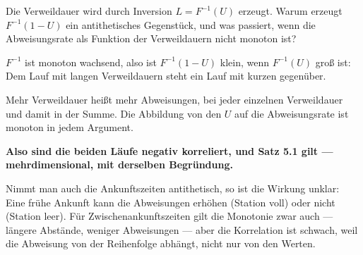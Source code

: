 \begin{aufgabe}
Die Verweildauer wird durch Inversion $L = F^{-1}(U)$ erzeugt. Warum erzeugt $F^{-1}(1-U)$ ein antithetisches Gegenstück, und was passiert, wenn die Abweisungsrate als Funktion der Verweildauern nicht monoton ist?

\loesung
{}
$F^{-1}$ ist monoton wachsend, also ist $F^{-1}(1-U)$ klein, wenn $F^{-1}(U)$ groß ist: Dem Lauf mit langen Verweildauern steht ein Lauf mit kurzen gegenüber.

Mehr Verweildauer heißt mehr Abweisungen, bei jeder einzelnen Verweildauer und damit in der Summe. Die Abbildung von den $U$ auf die Abweisungsrate ist monoton in jedem Argument.

\begin{center}
\begin{minipage}{0.9\textwidth}
\textbf{Also sind die beiden Läufe negativ korreliert, und Satz 5.1 gilt --- mehrdimensional, mit derselben Begründung.}
\end{minipage}
\end{center}

Nimmt man auch die Ankunftszeiten antithetisch, so ist die Wirkung unklar: Eine frühe Ankunft kann die Abweisungen erhöhen (Station voll) oder nicht (Station leer). Für Zwischenankunftszeiten gilt die Monotonie zwar auch --- längere Abstände, weniger Abweisungen --- aber die Korrelation ist schwach, weil die Abweisung von der Reihenfolge abhängt, nicht nur von den Werten.

\begin{center}
\begin{minipage}{0.88\textwidth}
\end{minipage}
\end{center}
\end{aufgabe}

